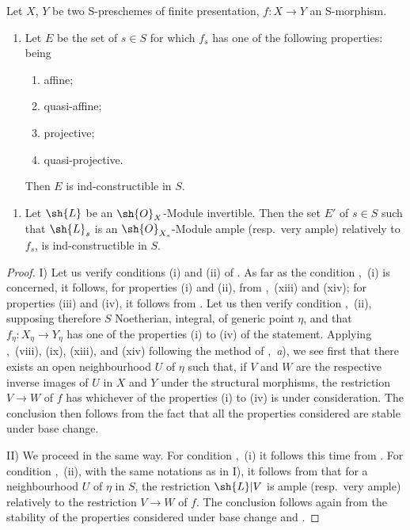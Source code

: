 \begin{proposition}[9.6.2]
\label{IV.9.6.2}
Let $X$, $Y$ be two S-preschemes of finite presentation, $f:X\to Y$ an S-morphism.
\begin{enumerate}[label=\upshape{I)}]
  \item Let $E$ be the set of $s\in S$ for which $f_s$ has one of the following properties: being
  \begin{enumerate}[label=(\roman*)]
    \item affine;
    \item quasi-affine;
    \item projective;
    \item quasi-projective.
  \end{enumerate}
  Then $E$ is ind-constructible in $S$.
\end{enumerate}


\begin{enumerate}[label=\upshape{II)}]
  \item Let $\sh{L}$ be an $\sh{O}_X$-Module invertible.
  Then the set $E'$ of $s\in S$ such that $\sh{L}_s$ is an $\sh{O}_{X_s}$-Module ample (resp.\ very ample) relatively to $f_s$, is ind-constructible in $S$.
\end{enumerate}
\end{proposition}

\begin{proof}
I) Let us verify conditions (i) and (ii) of .
As far as the condition ,~(i) is concerned, it follows, for properties (i) and (ii), from ,~(xiii) and (xiv); for properties (iii) and (iv), it follows from .
Let us then verify condition ,~(ii), supposing therefore $S$ Noetherian, integral, of generic point $\eta$, and that $f_\eta:X_\eta\to Y_\eta$ has one of the properties (i) to (iv) of the statement.
Applying ,~(viii), (ix), (xiii), and (xiv) following the method of ,~\emph{a}), we see first that there exists an open neighbourhood $U$ of $\eta$ such that, if $V$ and $W$ are the respective inverse images of $U$ in $X$ and $Y$ under the structural morphisms, the restriction $V\to W$ of $f$ has whichever of the properties (i) to (iv) is under consideration.
The conclusion then follows from the fact that all the properties considered are stable under base change.

II) We proceed in the same way.
For condition ,~(i) it follows this time from .
For condition ,~(ii), with the same notations as in I), it follows from  that for a neighbourhood $U$ of $\eta$ in $S$, the restriction $\sh{L}|V$ is ample (resp.\ very ample) relatively to the restriction $V\to W$ of $f$.
The conclusion follows again from the stability of the properties considered under base change  and .
\end{proof}

